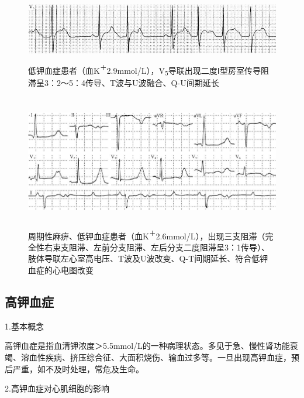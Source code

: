 \begin{figure}[!htbp]
 \centering
 \includegraphics[width=5.58333in,height=1.09375in]{./images/Image00730.jpg}
 \captionsetup{justification=centering}
 \caption{低钾血症患者（血K\textsuperscript{＋}2.9mmol/L），V\textsubscript{5}导联出现二度Ⅰ型房室传导阻滞呈3：2～5：4传导、T波与U波融合、Q-U间期延长}
 \label{fig45-2}
  \end{figure} 


\begin{figure}[!htbp]
 \centering
 \includegraphics[width=5.79167in,height=2.28125in]{./images/Image00731.jpg}
 \captionsetup{justification=centering}
 \caption{周期性麻痹、低钾血症患者（血K\textsuperscript{＋}2.6mmol/L），出现三支阻滞（完全性右束支阻滞、左前分支阻滞、左后分支二度阻滞呈3：1传导）、肢体导联左心室高电压、T波及U波改变、Q-T间期延长、符合低钾血症的心电图改变}
 \label{fig45-3}
  \end{figure} 


\protect\hypertarget{text00053.htmlux5cux23subid638}{}{}

\subsection{高钾血症}

1.基本概念

高钾血症是指血清钾浓度＞5.5mmol/L的一种病理状态。多见于急、慢性肾功能衰竭、溶血性疾病、挤压综合征、大面积烧伤、输血过多等。一旦出现高钾血症，预后严重，如不及时处理，常危及生命。

2.高钾血症对心肌细胞的影响

